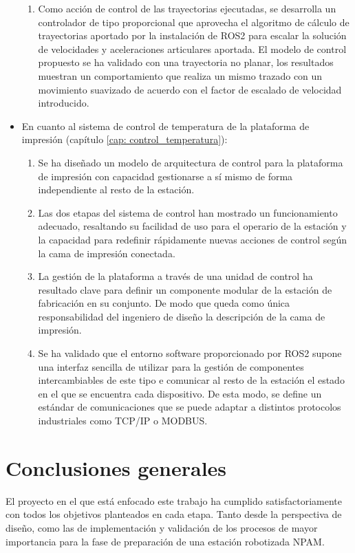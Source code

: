 \begin{itemize}
\begin{enumerate}
        \item Como acción de control de las trayectorias ejecutadas, se desarrolla un controlador de tipo proporcional que aprovecha el algoritmo de cálculo de trayectorias aportado por la instalación de ROS2 para escalar la solución de velocidades y aceleraciones articulares aportada. El modelo de control propuesto se ha validado con una trayectoria no planar, los resultados muestran un comportamiento que realiza un mismo trazado con un movimiento suavizado de acuerdo con el factor de escalado de velocidad introducido.
    \end{enumerate}

    \item En cuanto al sistema de control de temperatura de la plataforma de impresión (capítulo \ref{cap: control_temperatura}):
    \begin{enumerate}
        \item Se ha diseñado un modelo de arquitectura de control para la plataforma de impresión con capacidad gestionarse a sí mismo de forma independiente al resto de la estación.
        \item Las dos etapas del sistema de control han mostrado un funcionamiento adecuado, resaltando su facilidad de uso para el operario de la estación y la capacidad para redefinir rápidamente nuevas acciones de control según la cama de impresión conectada.
        \item La gestión de la plataforma a través de una unidad de control ha resultado clave para definir un componente modular de la estación de fabricación en su conjunto. De modo que queda como única responsabilidad del ingeniero de diseño la descripción de la cama de impresión.
        \item Se ha validado que el entorno software proporcionado por ROS2 supone una interfaz sencilla de utilizar para la gestión de componentes intercambiables de este tipo e comunicar al resto de la estación el estado en el que se encuentra cada dispositivo. De esta modo, se define un estándar de comunicaciones que se puede adaptar a distintos protocolos industriales como \acrshort{TCP/IP} o MODBUS.
    \end{enumerate}
\end{itemize}

\section{Conclusiones generales}
El proyecto en el que está enfocado este trabajo ha cumplido satisfactoriamente con todos los objetivos planteados en cada etapa. Tanto desde la perspectiva de diseño, como las de implementación y validación de los procesos de mayor importancia para la fase de preparación de una estación robotizada \acrshort{NPAM}.

